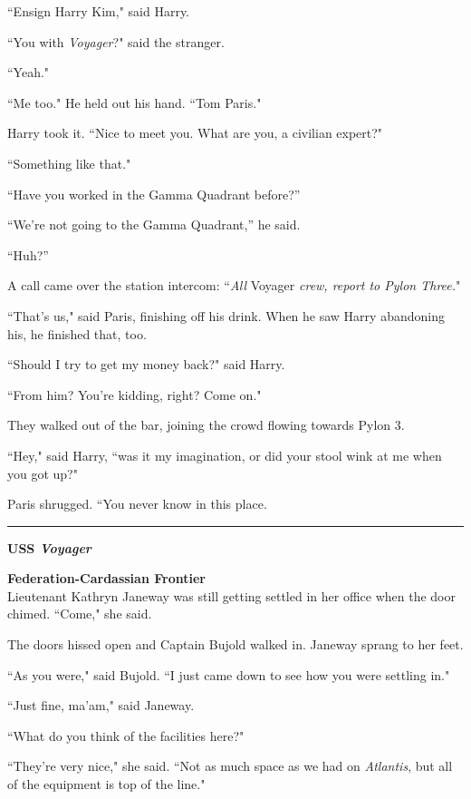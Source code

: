\documentclass[twoside,letterpaper,12pt]{memoir}
\begin{document}
``Ensign Harry Kim," said Harry.

``You with \textit{Voyager}?" said the stranger.

``Yeah."

``Me too." He held out his hand. ``Tom Paris."

Harry took it. ``Nice to meet you. What are you, a civilian expert?"

``Something like that."

``Have you worked in the Gamma Quadrant before?''

``We're not going to the Gamma Quadrant,'' he said.

``Huh?''

A call came over the station intercom: ``\textit{All} Voyager \textit{crew, report to Pylon Three.}"

``That's us," said Paris, finishing off his drink. When he saw Harry abandoning his, he finished that, too.

``Should I try to get my money back?" said Harry.

``From him? You're kidding, right? Come on."

They walked out of the bar, joining the crowd flowing towards Pylon 3.

``Hey," said Harry, ``was it my imagination, or did your stool wink at me when you got up?"

Paris shrugged. ``You never know in this place.


\begin{center}\rule{3cm}{0.4 pt}\end{center}

\noindent\textbf{USS \textit{Voyager}}

\noindent\textbf{Federation-Cardassian Frontier}\\

Lieutenant Kathryn Janeway was still getting settled in her office when the door chimed. ``Come," she said.

The doors hissed open and Captain Bujold walked in. Janeway sprang to her feet.

``As you were," said Bujold. ``I just came down to see how you were settling in."

``Just fine, ma'am," said Janeway.

``What do you think of the facilities here?"

``They're very nice," she said. ``Not as much space as we had on \textit{Atlantis}, but all of the equipment is top of the line."
\end{document}
